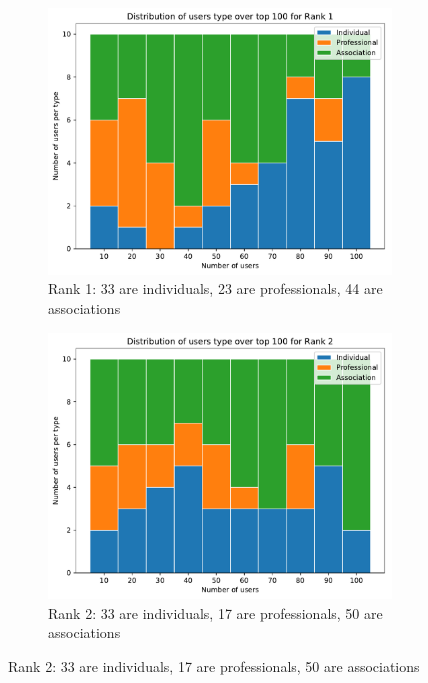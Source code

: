 \begin{figure}
	\centering
	\begin{subfigure}{.49\textwidth}
		\centering
		\includegraphics[width=\textwidth]{figures/rank1-distribution.pdf}
		\caption{Rank 1: 33 are individuals, 23 are professionals, 44 are associations}
		\label{fig:rank1-distribution}
	\end{subfigure}
	\hfill%
	\begin{subfigure}{.49\textwidth}
		\centering
		\includegraphics[width=1\textwidth]{figures/rank2-distribution.pdf}
		\caption{Rank 2: 33 are individuals, 17 are professionals, 50 are associations}
		\label{fig:rank2-distribution}
	\end{subfigure}

\end{figure}
